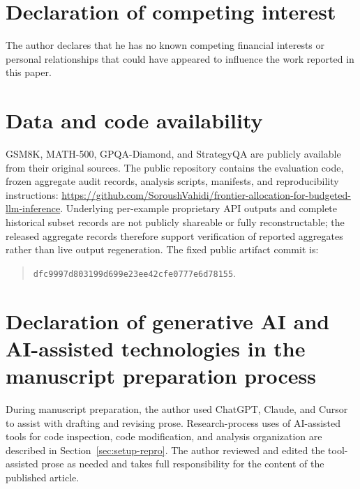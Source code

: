 \documentclass[preprint,12pt]{elsarticle}
\begin{document}
\section*{Declaration of competing interest}
The author declares that he has no known competing financial interests or personal relationships
that could have appeared to influence the work reported in this paper.

\section*{Data and code availability}
GSM8K, MATH-500, GPQA-Diamond, and StrategyQA are publicly available from their original sources.
The public repository contains the evaluation code, frozen aggregate audit records, analysis scripts,
manifests, and reproducibility instructions:
\href{https://github.com/SoroushVahidi/frontier-allocation-for-budgeted-llm-inference}{\url{https://github.com/SoroushVahidi/frontier-allocation-for-budgeted-llm-inference}}.
Underlying per-example proprietary API outputs and complete historical subset records are not publicly
shareable or fully reconstructable; the released aggregate records therefore support verification of
reported aggregates rather than live output regeneration.
The fixed public artifact commit is:
\begin{quote}
\texttt{dfc9997d803199d699e23ee42cfe0777e6d78155}.
\end{quote}

\section*{Declaration of generative AI and AI-assisted technologies in the manuscript preparation process}
During manuscript preparation, the author used ChatGPT, Claude, and Cursor to assist with drafting
and revising prose. Research-process uses of AI-assisted tools for code inspection, code
modification, and analysis organization are described in Section~\ref{sec:setup-repro}. The author
reviewed and edited the tool-assisted prose as needed and takes full responsibility for the content
of the published article.




\newpage
\appendix

\end{document}
